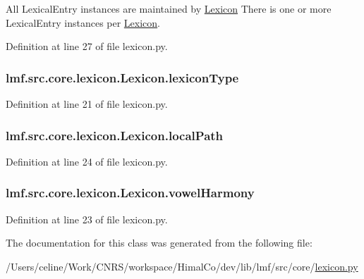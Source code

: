 All Lexical\+Entry instances are maintained by \hyperlink{classlmf_1_1src_1_1core_1_1lexicon_1_1_lexicon}{Lexicon} There is one or more Lexical\+Entry instances per \hyperlink{classlmf_1_1src_1_1core_1_1lexicon_1_1_lexicon}{Lexicon}. 



Definition at line 27 of file lexicon.\+py.

\hypertarget{classlmf_1_1src_1_1core_1_1lexicon_1_1_lexicon_af434e15172d6aa59954db2a72c9f15f0}{
\subsubsection[{lexicon\+Type}]{\setlength{\rightskip}{0pt plus 5cm}lmf.\+src.\+core.\+lexicon.\+Lexicon.\+lexicon\+Type}}\label{classlmf_1_1src_1_1core_1_1lexicon_1_1_lexicon_af434e15172d6aa59954db2a72c9f15f0}


Definition at line 21 of file lexicon.\+py.

\hypertarget{classlmf_1_1src_1_1core_1_1lexicon_1_1_lexicon_a972bee199d27a70fa75321bffd70a6b1}{
\subsubsection[{local\+Path}]{\setlength{\rightskip}{0pt plus 5cm}lmf.\+src.\+core.\+lexicon.\+Lexicon.\+local\+Path}}\label{classlmf_1_1src_1_1core_1_1lexicon_1_1_lexicon_a972bee199d27a70fa75321bffd70a6b1}


Definition at line 24 of file lexicon.\+py.

\hypertarget{classlmf_1_1src_1_1core_1_1lexicon_1_1_lexicon_a0c55ecd82285a7d3dc5d5ebcb1445c25}{
\subsubsection[{vowel\+Harmony}]{\setlength{\rightskip}{0pt plus 5cm}lmf.\+src.\+core.\+lexicon.\+Lexicon.\+vowel\+Harmony}}\label{classlmf_1_1src_1_1core_1_1lexicon_1_1_lexicon_a0c55ecd82285a7d3dc5d5ebcb1445c25}


Definition at line 23 of file lexicon.\+py.



The documentation for this class was generated from the following file\+:\begin{DoxyCompactItemize}
\item 
/\+Users/celine/\+Work/\+C\+N\+R\+S/workspace/\+Himal\+Co/dev/lib/lmf/src/core/\hyperlink{lexicon_8py}{lexicon.\+py}\end{DoxyCompactItemize}
